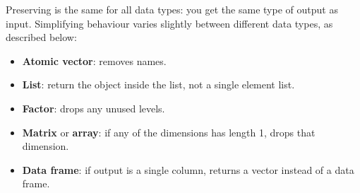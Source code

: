 Preserving is the same for all data types: you get the same type of
output as input. Simplifying behaviour varies slightly between different
data types, as described below:

\begin{itemize}
\item
  \textbf{Atomic vector}: removes names.

\begin{Shaded}
\begin{Highlighting}[]
\StringTok{ }\NormalTok{(} \NormalTok{, } \NormalTok{)}
\NormalTok{x[}\NormalTok{]}
\NormalTok{x[[}\NormalTok{]]}
\end{Highlighting}
\end{Shaded}
\item
  \textbf{List}: return the object inside the list, not a single element
  list.

\begin{Shaded}
\begin{Highlighting}[]
\StringTok{ }\NormalTok{(} \NormalTok{, } \NormalTok{)}
\NormalTok{(y[}\NormalTok{])}
\NormalTok{(y[[}\NormalTok{]])}
\end{Highlighting}
\end{Shaded}
\item
  \textbf{Factor}: drops any unused levels.

\begin{Shaded}
\begin{Highlighting}[]
\StringTok{ }\NormalTok{(}\NormalTok{(}\NormalTok{, }\NormalTok{))}
\NormalTok{z[}\NormalTok{]}
\NormalTok{z[}\StringTok{ }\NormalTok{]}
\end{Highlighting}
\end{Shaded}
\item
  \textbf{Matrix} or \textbf{array}: if any of the dimensions has length
  1, drops that dimension.

\begin{Shaded}
\begin{Highlighting}[]
\StringTok{ }\NormalTok{(}\NormalTok{:}\NormalTok{, } \NormalTok{)}
\NormalTok{a[}\StringTok{ }\NormalTok{]}
\CommentTok{#>      [,1] [,2]}
\NormalTok{a[}\NormalTok{, ]}
\end{Highlighting}
\end{Shaded}
\item
  \textbf{Data frame}: if output is a single column, returns a vector
  instead of a data frame.


\end{itemize}
